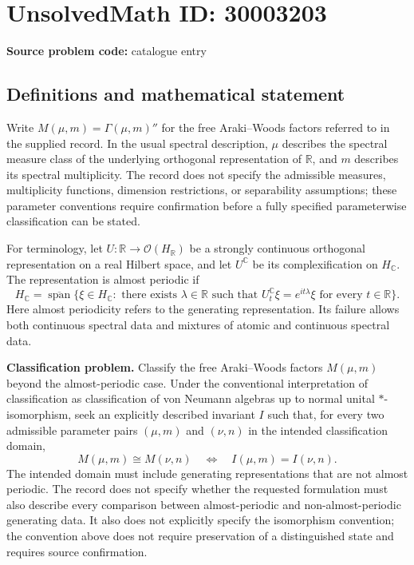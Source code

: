 \documentclass[11pt]{article}
\newcommand{\R}{\mathbb{R}}
\newcommand{\C}{\mathbb{C}}
\begin{document}
\section*{UnsolvedMath ID: 30003203}
\textbf{Source problem code:} catalogue entry
\subsection{Definitions and mathematical statement}
Write \(M(\mu,m)=\Gamma(\mu,m)''\) for the free Araki--Woods factors referred to in the supplied record. In the usual spectral description, \(\mu\) describes the spectral measure class of the underlying orthogonal representation of \(\R\), and \(m\) describes its spectral multiplicity. The record does not specify the admissible measures, multiplicity functions, dimension restrictions, or separability assumptions; these parameter conventions require confirmation before a fully specified parameterwise classification can be stated.

For terminology, let \(U:\R\to\mathcal O(H_{\R})\) be a strongly continuous orthogonal representation on a real Hilbert space, and let \(U^{\C}\) be its complexification on \(H_{\C}\). The representation is almost periodic if
\[
H_{\C}=\overline{\operatorname{span}}\bigl\{\xi\in H_{\C}:\text{ there exists }\lambda\in\R\text{ such that }U_t^{\C}\xi=e^{it\lambda}\xi\text{ for every }t\in\R\bigr\}.
\]
Here almost periodicity refers to the generating representation. Its failure allows both continuous spectral data and mixtures of atomic and continuous spectral data.

\textbf{Classification problem.} Classify the free Araki--Woods factors \(M(\mu,m)\) beyond the almost-periodic case. Under the conventional interpretation of classification as classification of von Neumann algebras up to normal unital \(*\)-isomorphism, seek an explicitly described invariant \(I\) such that, for every two admissible parameter pairs \((\mu,m)\) and \((\nu,n)\) in the intended classification domain,
\[
M(\mu,m)\cong M(\nu,n)
\quad\Longleftrightarrow\quad
I(\mu,m)=I(\nu,n).
\]
The intended domain must include generating representations that are not almost periodic. The record does not specify whether the requested formulation must also describe every comparison between almost-periodic and non-almost-periodic generating data. It also does not explicitly specify the isomorphism convention; the convention above does not require preservation of a distinguished state and requires source confirmation.
\end{document}
